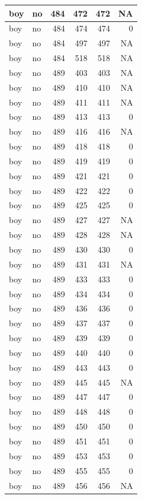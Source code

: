 \documentclass[man]{apa6}
\begin{document}
\begin{tabular}{l|l|r|r|r|r}
\hline
boy & no & 484 & 472 & 472 & NA\\
\hline
boy & no & 484 & 474 & 474 & 0\\
\hline
boy & no & 484 & 497 & 497 & NA\\
\hline
boy & no & 484 & 518 & 518 & NA\\
\hline
boy & no & 489 & 403 & 403 & NA\\
\hline
boy & no & 489 & 410 & 410 & NA\\
\hline
boy & no & 489 & 411 & 411 & NA\\
\hline
boy & no & 489 & 413 & 413 & 0\\
\hline
boy & no & 489 & 416 & 416 & NA\\
\hline
boy & no & 489 & 418 & 418 & 0\\
\hline
boy & no & 489 & 419 & 419 & 0\\
\hline
boy & no & 489 & 421 & 421 & 0\\
\hline
boy & no & 489 & 422 & 422 & 0\\
\hline
boy & no & 489 & 425 & 425 & 0\\
\hline
boy & no & 489 & 427 & 427 & NA\\
\hline
boy & no & 489 & 428 & 428 & NA\\
\hline
boy & no & 489 & 430 & 430 & 0\\
\hline
boy & no & 489 & 431 & 431 & NA\\
\hline
boy & no & 489 & 433 & 433 & 0\\
\hline
boy & no & 489 & 434 & 434 & 0\\
\hline
boy & no & 489 & 436 & 436 & 0\\
\hline
boy & no & 489 & 437 & 437 & 0\\
\hline
boy & no & 489 & 439 & 439 & 0\\
\hline
boy & no & 489 & 440 & 440 & 0\\
\hline
boy & no & 489 & 443 & 443 & 0\\
\hline
boy & no & 489 & 445 & 445 & NA\\
\hline
boy & no & 489 & 447 & 447 & 0\\
\hline
boy & no & 489 & 448 & 448 & 0\\
\hline
boy & no & 489 & 450 & 450 & 0\\
\hline
boy & no & 489 & 451 & 451 & 0\\
\hline
boy & no & 489 & 453 & 453 & 0\\
\hline
boy & no & 489 & 455 & 455 & 0\\
\hline
boy & no & 489 & 456 & 456 & NA\\

\end{tabular}
\end{document}
